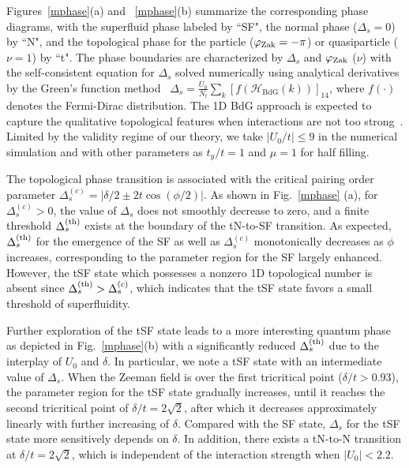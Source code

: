 \documentclass[twocolumn,prl,superscriptaddress,amsmath,amssymb]{revtex4} %
\begin{document}
Figures~\ref{mphase}(a) and ~\ref{mphase}(b) summarize the corresponding phase diagrams, with the superfluid phase labeled by ``SF", the normal phase ($\Delta_s=0$) by ``N", and the topological phase for the particle ($\varphi_{\rm{Zak}}=-\pi$) or quasiparticle ($\nu=1$) by ``t". The phase boundaries are characterized by $\Delta_s$ and $\varphi_{\rm{Zak}}$ ($\nu$) with the self-consistent equation for $\Delta_s$ solved numerically using analytical derivatives by the Green's function method~\cite{Deng2016} $\Delta_{s} = \frac{U_0}{N_l}\sum_{k}\left[f(\mathcal{H}_{\text{BdG}}({ k}))\right]_{14}$, where $f(\cdot)$ denotes the Fermi-Dirac distribution. The 1D BdG approach is expected to capture the qualitative topological features when interactions are not too strong~\cite{Haller09}. Limited by the validity regime of our theory, we take $|U_0/t|\leq 9$ in the numerical simulation and with other parameters as $t_{y}/t=1$ and $\mu=1$ for half filling.

The topological phase transition is associated with the critical pairing order parameter $\Delta^{(c)}_{s}=|\delta/2\pm2t\cos(\phi/2)|$. As shown in Fig.~\ref{mphase} (a), for $\Delta^{(c)}_{s}>0$, the value of $\Delta_s$ does not smoothly decrease to zero, and a finite threshold $\Delta^{(\rm{th})}_s$ exists at the boundary of the tN-to-SF transition. As expected, $\Delta^{(\rm{th})}_s$ for the emergence of the SF as well as $\Delta^{(c)}_{s}$ monotonically decreases as $\phi$ increases, corresponding to the parameter region for the SF largely enhanced. However, the tSF state which possesses a nonzero 1D topological number is absent since $\Delta^{(\rm{th})}_s >\Delta^{(c)}_{s}$, which indicates that the tSF state favors a small threshold of superfluidity.

Further exploration of the tSF state leads to a more interesting quantum phase as depicted in Fig.~\ref{mphase}(b) with a significantly reduced $\Delta_s^{(\rm{th})}$ due to the interplay of $U_0$ and $\delta$. In particular, we note a tSF state with an intermediate value of $\Delta_s$. When the Zeeman field is over the first tricritical point ($\delta/t>0.93$), the parameter region for the tSF state gradually increases, until it reaches the second tricritical point of $\delta/t=2\sqrt{2}$,
after which it decreases approximately linearly with further increasing of $\delta$. Compared with the SF state, $\Delta_s$ for the tSF state more sensitively depends on $\delta$. In addition, there exists a tN-to-N transition at $\delta/t=2\sqrt{2}$,
which is independent of the interaction strength when $|U_0|<2.2$.
\end{document}
